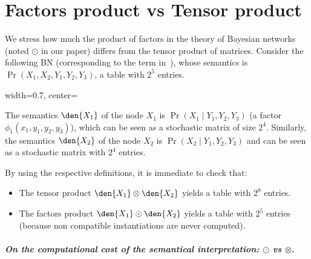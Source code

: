 \appendix

\section{Factors product vs Tensor product}
\label{app:cost}\label{app:section2}


We stress how much the product of factors in the theory of Bayesian networks (noted $\odot$ in our paper) differs from the tensor product of matrices. 
Consider the following BN (corresponding to the term in~\cite[Example 9.7]{popl24}), whose semantics is $\Pr(X_1, X_2,Y_1,Y_2,Y_3)$, a table with $2^5$ entries.

\begin{adjustbox}{width=0.7\linewidth, center=\linewidth}
\end{adjustbox}
The semantics $\den{X_1}$ of the node $X_1$ is $\Pr(X_1 \mid Y_1,Y_2,Y_3)$ (a factor $\phi_1(x_1,y_1,y_2,y_3)$), which can be seen as a stochastic matrix of size $2^4$.
Similarly, the semantics $\den{X_2}$ of the node $X_2$ is $\Pr(X_2 \mid Y_1,Y_2,Y_3)$ and can be seen as a stochastic matrix with $2^4$ entries.

By using the respective definitions, it is immediate to check that:
\begin{itemize}
\item
The tensor product $\den {X_1} \otimes \den {X_2} $ yields a table with $2^8$ entries.
\item
The factors product $\den {X_1} \odot \den {X_2} $ yields a table with $2^5$ entries (because non compatible instantiations are never computed).
\end{itemize}

\subparagraph{On the computational cost of the semantical interpretation: $\odot$ vs $\otimes$.}

